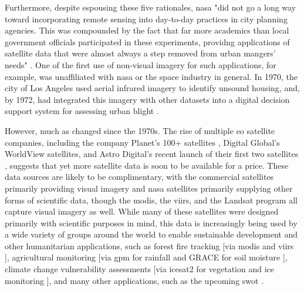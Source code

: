 Furthermore, despite espousing these five rationales, \ac{nasa} "did not go a long way toward incorporating remote sensing into day-to-day practices in city planning agencies. This was compounded by the fact that far more academics than local government officials participated in these experiments, providng applications of satellite data that were almost always a step removed from urban mangers' needs" \cite{lightWarfareWelfareDefense2005}. One of the first use of non-visual imagery for such applications, for example, was unaffiliated with \ac{nasa} or the space industry in general. In 1970, the city of Los Angeles used aerial infrared imagery to identify unsound housing, and, by 1972, had integrated this imagery with other datasets into a digital decision support system for assessing urban blight \cite{lightWarfareWelfareDefense2005}.

However, much as changed since the 1970s. The rise of multiple \ac{eo} satellite companies, including the company Planet's 100+ satellites \cite{tepperSatelliteMakerPlanet2015}, Digital Global's WorldView satellites, and Astro Digital’s recent launch of their first two satellites \cite{shieberAstroDigitalLaunched2017}, suggests that yet more satellite data is soon to be available for a price. These data sources are likely to be complimentary, with the commercial satellites primarily providing visual imagery and \ac{nasa} satellites primarily supplying other forms of scientific data, though the \ac{modis}, the \ac{viirs}, and the Landsat program all capture visual imagery as well. While many of these satellites were designed primarily with scientific purposes in mind, this data is increasingly being used by a wide variety of groups around the world to enable sustainable development and other humanitarian applications, such as  forest fire tracking [via \ac{modis} and \ac{viirs} \cite{schroederNewVIIRS375m2014}], agricultural monitoring [via \ac{gpm} for rainfall \cite{houGlobalPrecipitationMeasurement2014} and GRACE for soil moisture \cite{wahrTimevariableGravityGRACE2004}], climate change vulnerability assessments [via \ac{icesat2} for vegetation and ice monitoring \cite{mcgillMultipleAltimeterBeam2013}], and many other applications, such as the upcoming \ac{swot} \cite{biancamariaSWOTMissionIts2016}.

